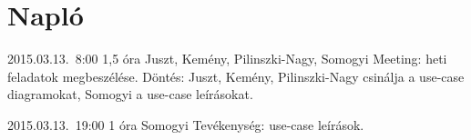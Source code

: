 %
\section{Napló}

\begin{naplo}

\bejegyzes
{2015.03.13.~8:00} %
{1,5 óra} %
{Juszt, Kemény, Pilinszki-Nagy, Somogyi} %
{Meeting: heti feladatok megbeszélése. Döntés: Juszt, Kemény, Pilinszki-Nagy csinálja a use-case diagramokat, Somogyi a use-case leírásokat.} %

{2015.03.13.~19:00} %
{1 óra} %
{Somogyi} %
{Tevékenység: use-case leírások.} %

\end{naplo}

